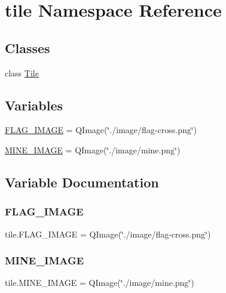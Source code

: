 \hypertarget{namespacetile}{}\section{tile Namespace Reference}
\label{namespacetile}
\subsection*{Classes}
\begin{DoxyCompactItemize}
\item 
class \mbox{\hyperlink{classtile_1_1_tile}{Tile}}
\end{DoxyCompactItemize}
\subsection*{Variables}
\begin{DoxyCompactItemize}
\item 
\mbox{\hyperlink{namespacetile_a5fde07459eab783bdc8b17786ff11b38}{F\+L\+A\+G\+\_\+\+I\+M\+A\+GE}} = Q\+Image(\char`\"{}./image/flag-\/cross.\+png\char`\"{})
\item 
\mbox{\hyperlink{namespacetile_ae1e1d59499d5404a0c7534a386d26499}{M\+I\+N\+E\+\_\+\+I\+M\+A\+GE}} = Q\+Image(\char`\"{}./image/mine.\+png\char`\"{})
\end{DoxyCompactItemize}


\subsection{Variable Documentation}
\mbox{\label{namespacetile_a5fde07459eab783bdc8b17786ff11b38}} 
\subsubsection{\texorpdfstring{FLAG\_IMAGE}{FLAG\_IMAGE}}
{\footnotesize\ttfamily tile.\+F\+L\+A\+G\+\_\+\+I\+M\+A\+GE = Q\+Image(\char`\"{}./image/flag-\/cross.\+png\char`\"{})}

\mbox{\label{namespacetile_ae1e1d59499d5404a0c7534a386d26499}} 
\subsubsection{\texorpdfstring{MINE\_IMAGE}{MINE\_IMAGE}}
{\footnotesize\ttfamily tile.\+M\+I\+N\+E\+\_\+\+I\+M\+A\+GE = Q\+Image(\char`\"{}./image/mine.\+png\char`\"{})}

